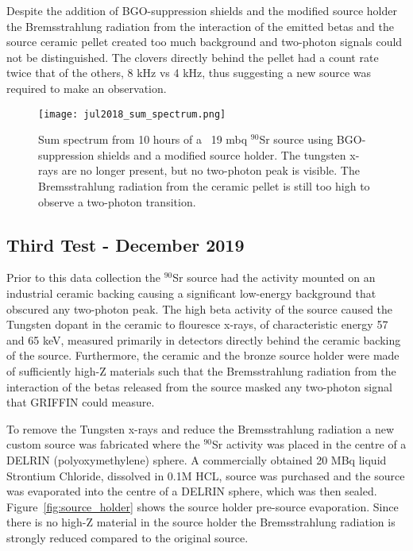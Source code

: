 \documentclass[cnatzke_thesis_proposal.tex]{subfiles}
\begin{document}
Despite the addition of BGO-suppression shields and the modified source holder the Bremsstrahlung radiation from the interaction of the emitted betas and the source ceramic pellet created too much background and two-photon signals could not be distinguished.
The clovers directly behind the pellet had a count rate twice that of the others, 8 kHz vs 4 kHz, thus suggesting a new source was required to make an observation.

\begin{figure}[htbp]
  \centering
  \texttt{[image: jul2018\_sum\_spectrum.png]}
  \caption{Sum spectrum from 10 hours of a ~19 mbq $^{90}$Sr source using BGO-suppression shields and a modified source holder. The tungsten x-rays are no longer present, but no two-photon peak is visible. The Bremsstrahlung radiation from the ceramic pellet is still too high to observe a two-photon transition.}
  \label{fig:sum_spectrum_jul2018}
\end{figure}

\subsection{Third Test - December 2019}

Prior to this data collection the $^{90}$Sr source had the activity mounted on an industrial ceramic backing causing a significant low-energy background that obscured any two-photon peak.
The high beta activity of the source caused the Tungsten dopant in the ceramic to flouresce x-rays, of characteristic energy 57 and 65 keV, measured primarily in detectors directly behind the ceramic backing of the source.
Furthermore, the ceramic and the bronze source holder were made of sufficiently high-Z materials such that the Bremsstrahlung radiation from the interaction of the betas released from the source masked any two-photon signal that GRIFFIN could measure.

To remove the Tungsten x-rays and reduce the Bremsstrahlung radiation a new custom source was fabricated where the $^{90}$Sr activity was placed in the centre of a DELRIN (polyoxymethylene) sphere.
A commercially obtained 20 MBq liquid Strontium Chloride, dissolved in 0.1M HCL, source was purchased and the source was evaporated into the centre of a DELRIN sphere, which was then sealed.
Figure~\ref{fig:source_holder} shows the source holder pre-source evaporation.
Since there is no high-Z material in the source holder the Bremsstrahlung radiation is strongly reduced compared to the original source.
\end{document}
